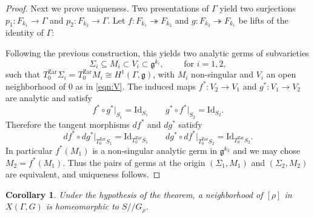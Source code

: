 \documentclass[a4paper,11pt]{article}
\newtheorem{Corollary}[Theorem]{Corollary}
\begin{document}
\begin{proof}
Next we prove uniqueness. Two presentations of $\Gamma$ yield two surjections $p_1\colon F_{k_1}\to\Gamma$ and 
$p_2\colon F_{k_2}\to\Gamma$. Let $f\colon  F_{k_1}\twoheadrightarrow F_{k_2}$ and $g\colon  F_{k_2}\twoheadrightarrow F_{k_1}$ 
be lifts of the identity of $\Gamma$:
\begin{center}
\end{center}
Following the previous construction, this yields two analytic germs of subvarieties 
$$
\Sigma_i\subseteq M_i\subset V_i\subset \mathfrak g^{k_i},\qquad\textrm{ for }i=1,2,
$$
such that $T_{0}^{\mathrm{Zar}}\Sigma_i=T_{0}^{\mathrm{Zar}} M_i\cong H^1(\Gamma,\mathfrak g)$, with $M_i$ non-singular and $V_i$
an open neighborhood of $0$ as in \eqref{eqn:V}.
The induced maps $f^* \colon V_2\to V_1$ and $g^* \colon V_1\to V_2$  are  analytic and satisfy
$$ f^*\circ g^*\vert_ {S_1}=\mathrm{Id}_{S_1} \qquad  g^*\circ f^*\vert_ {S_2}=\mathrm{Id}_{S_2}. $$
Therefore the tangent morphisms $d f^*$ and $d g^*$ satisfy 
$$ df^*\circ dg^*\vert_ {T^{\mathrm{Zar}}_0 S_1}=\mathrm{Id}_{T^{\mathrm{Zar}}_0 S_1} \qquad  
dg^*\circ df^*\vert_ {T^{\mathrm{Zar}}_0S_2}=\mathrm{Id}_{T^{\mathrm{Zar}}_0 S_2}. $$
In particular $f^* (M_1)$ is a non-singular analytic germ in $\mathfrak g^{k_2}$
and we may chose $M_2=f^* (M_1)$. 
Thus the pairs of germs at the origin
$(\Sigma_1,M_1)$ and $(\Sigma_2,M_2)$  are equivalent, and uniqueness follows. 
\end{proof}




\begin{Corollary}
\label{Corollary:quotient}
Under the hypothesis of the theorem,  a neighborhood of $[\rho]$ in $X(\Gamma, G)$ is homeomorphic
 to $S/\!/{G_\rho}$.
\end{Corollary}
 
\end{document}

